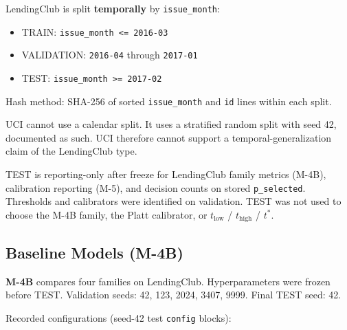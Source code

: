 \documentclass{ieeeaccess}
\begin{document}
LendingClub is split \textbf{temporally} by \texttt{issue\_month}:

\begin{itemize}
\item TRAIN: \texttt{issue\_month <= 2016-03}
\item VALIDATION: \texttt{2016-04} through \texttt{2017-01}
\item TEST: \texttt{issue\_month >= 2017-02}

\end{itemize}
Hash method: SHA-256 of sorted \texttt{issue\_month} and \texttt{id} lines within each split.

UCI cannot use a calendar split. It uses a stratified random split with seed 42, documented as such. UCI therefore cannot support a temporal-generalization claim of the LendingClub type.

TEST is reporting-only after freeze for LendingClub family metrics (M-4B), calibration reporting (M-5), and decision counts on stored \texttt{p\_selected}. Thresholds and calibrators were identified on validation. TEST was not used to choose the M-4B family, the Platt calibrator, or \(t_{\text{low}}\) / \(t_{\text{high}}\) / \(t^{*}\).

\subsection{Baseline Models (M-4B)}

\textbf{M-4B} compares four families on LendingClub. Hyperparameters were frozen before TEST. Validation seeds: 42, 123, 2024, 3407, 9999. Final TEST seed: 42.

Recorded configurations (seed-42 test \texttt{config} blocks):
\end{document}
